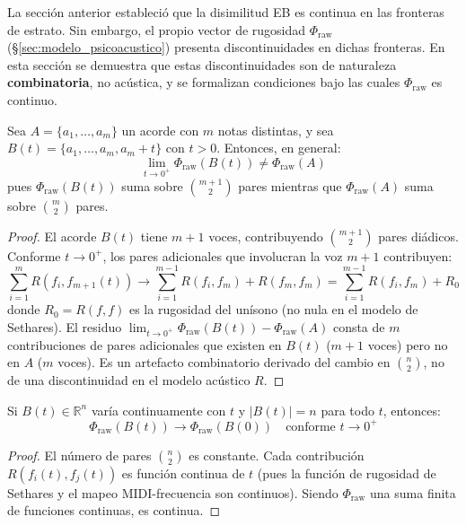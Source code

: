 La sección anterior estableció que la disimilitud EB es continua en las fronteras de estrato. Sin embargo, el propio vector de rugosidad $\Phi_{\text{raw}}$ (§\ref{sec:modelo_psicoacustico}) presenta discontinuidades en dichas fronteras. En esta sección se demuestra que estas discontinuidades son de naturaleza \textbf{combinatoria}, no acústica, y se formalizan condiciones bajo las cuales $\Phi_{\text{raw}}$ es continuo.

\begin{theorem}
\label{thm:discontinuidad}
Sea $A = \{a_1, \ldots, a_m\}$ un acorde con $m$ notas distintas, y sea $B(t) = \{a_1, \ldots, a_m, a_m + t\}$ con $t > 0$. Entonces, en general:
\begin{equation}
\lim_{t \to 0^+} \Phi_{\text{raw}}(B(t)) \neq \Phi_{\text{raw}}(A)
\end{equation}
pues $\Phi_{\text{raw}}(B(t))$ suma sobre $\binom{m+1}{2}$ pares mientras que $\Phi_{\text{raw}}(A)$ suma sobre $\binom{m}{2}$ pares.
\end{theorem}

\begin{proof}
El acorde $B(t)$ tiene $m+1$ voces, contribuyendo $\binom{m+1}{2}$ pares diádicos. Conforme $t \to 0^+$, los pares adicionales que involucran la voz $m+1$ contribuyen:
\begin{equation}
\sum_{i=1}^{m} R(f_i, f_{m+1}(t)) \to \sum_{i=1}^{m-1} R(f_i, f_m) + R(f_m, f_m) = \sum_{i=1}^{m-1} R(f_i, f_m) + R_0
\end{equation}
donde $R_0 = R(f, f)$ es la rugosidad del unísono (no nula en el modelo de Sethares). El residuo $\lim_{t \to 0^+} \Phi_{\text{raw}}(B(t)) - \Phi_{\text{raw}}(A)$ consta de $m$ contribuciones de pares adicionales que existen en $B(t)$ ($m+1$ voces) pero no en $A$ ($m$ voces). Es un artefacto combinatorio derivado del cambio en $\binom{n}{2}$, no de una discontinuidad en el modelo acústico $R$.
\end{proof}

\begin{theorem}
\label{thm:continuidad_constante}
Si $B(t) \in \mathbb{R}^n$ varía continuamente con $t$ y $|B(t)| = n$ para todo $t$, entonces:
\begin{equation}
\Phi_{\text{raw}}(B(t)) \to \Phi_{\text{raw}}(B(0)) \quad \text{conforme } t \to 0^+
\end{equation}
\end{theorem}

\begin{proof}
El número de pares $\binom{n}{2}$ es constante. Cada contribución $R(f_i(t), f_j(t))$ es función continua de $t$ (pues la función de rugosidad de Sethares y el mapeo MIDI-frecuencia son continuos). Siendo $\Phi_{\text{raw}}$ una suma finita de funciones continuas, es continua.
\end{proof}

